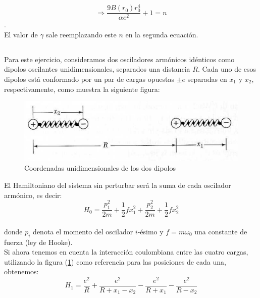 \documentclass[a4paper]{article}
\begin{document}
$$ \Rightarrow \frac{9B(r_{0})r_{0}^{4}}{\alpha e^{2}} + 1 = n$$.\\

El valor de $\gamma$ sale reemplazando este $n$ en la segunda ecuaci\'on.

\subsection{}

Para este ejercicio, consideramos dos osciladores arm\'onicos id\'enticos como dipolos oscilantes unidimensionales, separados una distancia $R$. Cada uno de esos dipolos est\'a conformado por un par de cargas opuestas $\pm e$ separadas en $x_{1}$ y $x_{2}$, respectivamente, como muestra la siguiente figura:

\begin{figure}[H]
  \centering
  \includegraphics[width=0.6\linewidth,height=0.2\linewidth]{dipolos.png}
  \caption{Coordenadas unidimensionales de los dos dipolos}
  \label{fig:dipolos}
\end{figure}

El Hamiltoniano del sistema sin perturbar ser\'a la suma de cada oscilador arm\'onico, es decir:\\

\begin{equation}
\label{eq:h0}
H_{0} = \frac{p_{1}^{2}}{2m} + \frac{1}{2}fx_{1}^{2} + \frac{p_{2}^{2}}{2m} + \frac{1}{2}fx_{2}^{2}
\end{equation}
\\

donde $p_{i}$ denota el momento del oscilador $i$-\'esimo y $f = m\omega_{0}$ una constante de fuerza (ley de Hooke).\\

Si ahora tenemos en cuenta la interacci\'on coulombiana entre las cuatro cargas, utilizando la figura (\ref{fig:dipolos}) como referencia para las posiciones de cada una, obtenemos:\\

\begin{equation}
\label{eq:h1}
H_{1} = \frac{e^{2}}{R} + \frac{e^{2}}{R + x_{1} - x_{2}} - \frac{e^{2}}{R + x_{1}} - \frac{e^{2}}{R - x_{2}}
\end{equation}
\\
\end{document}
